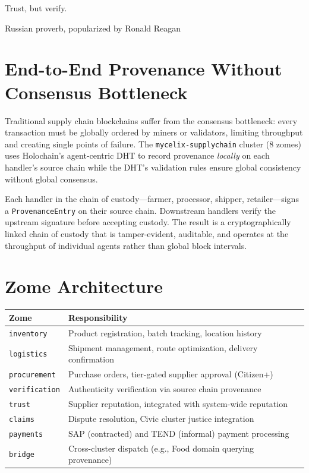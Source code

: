 \documentclass[12pt]{book}
\begin{document}
\epigraph{Trust, but verify.}{Russian proverb, popularized by Ronald Reagan}

\section{End-to-End Provenance Without Consensus Bottleneck}

Traditional supply chain blockchains suffer from the consensus
bottleneck: every transaction must be globally ordered by miners or
validators, limiting throughput and creating single points of failure.
The \texttt{mycelix-supplychain} cluster (8 zomes) uses Holochain's
agent-centric DHT to record provenance \emph{locally} on each handler's
source chain while the DHT's validation rules ensure global consistency
without global consensus.

Each handler in the chain of custody---farmer, processor, shipper,
retailer---signs a \texttt{ProvenanceEntry} on their source chain.
Downstream handlers verify the upstream signature before accepting
custody.  The result is a cryptographically linked chain of custody
that is tamper-evident, auditable, and operates at the throughput of
individual agents rather than global block intervals.

\section{Zome Architecture}

\begin{longtable}{lp{8cm}}
\toprule
\textbf{Zome} & \textbf{Responsibility} \\
\midrule
\endhead
\texttt{inventory}     & Product registration, batch tracking, location history \\
\texttt{logistics}     & Shipment management, route optimization, delivery confirmation \\
\texttt{procurement}   & Purchase orders, tier-gated supplier approval (Citizen+) \\
\texttt{verification}  & Authenticity verification via source chain provenance \\
\texttt{trust}         & Supplier reputation, integrated with system-wide reputation \\
\texttt{claims}        & Dispute resolution, Civic cluster justice integration \\
\texttt{payments}      & SAP (contracted) and TEND (informal) payment processing \\
\texttt{bridge}        & Cross-cluster dispatch (e.g., Food domain querying provenance) \\
\bottomrule
\end{longtable}
\end{document}
